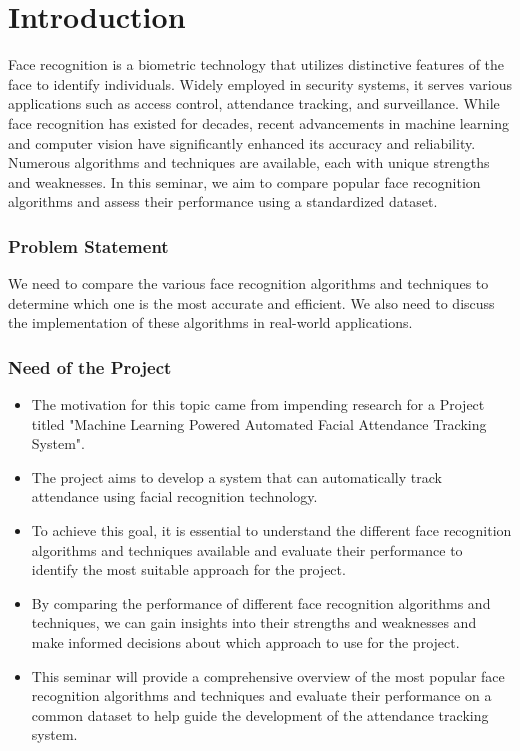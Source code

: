 \documentclass[openany]{report}
\begin{document}
\thispagestyle{empty}
\clearpage

\setcounter{page}{1}

\chapter{Introduction}

Face recognition is a biometric technology that utilizes distinctive features of the face to identify individuals. Widely employed in security systems, it serves various applications such as access control, attendance tracking, and surveillance. While face recognition has existed for decades, recent advancements in machine learning and computer vision have significantly enhanced its accuracy and reliability. Numerous algorithms and techniques are available, each with unique strengths and weaknesses. In this seminar, we aim to compare popular face recognition algorithms and assess their performance using a standardized dataset.

\subsection{Problem Statement}
We need to compare the various face recognition algorithms and techniques to determine which one is the most accurate and efficient. We also need to discuss the implementation of these algorithms in real-world applications.

\subsection{Need of the Project}

\begin{itemize}
    \item The motivation for this topic came from impending research for a Project titled "Machine Learning Powered Automated Facial Attendance Tracking System".
    \item The project aims to develop a system that can automatically track attendance using facial recognition technology.
    \item To achieve this goal, it is essential to understand the different face recognition algorithms and techniques available and evaluate their performance to identify the most suitable approach for the project.
    \item By comparing the performance of different face recognition algorithms and techniques, we can gain insights into their strengths and weaknesses and make informed decisions about which approach to use for the project.
    \item This seminar will provide a comprehensive overview of the most popular face recognition algorithms and techniques and evaluate their performance on a common dataset to help guide the development of the attendance tracking system.
\end{itemize}
\end{document}
